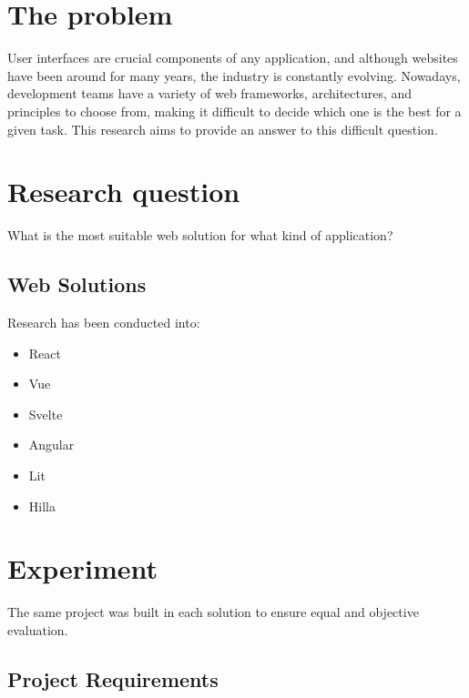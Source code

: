 \section{The problem}

User interfaces are crucial components of any application, and although websites have been around for many years, the industry is constantly evolving. Nowadays, development teams have a variety of web frameworks, architectures, and principles to choose from, making it difficult to decide which one is the best for a given task. This research aims to provide an answer to this difficult question.

\section{Research question}

What is the most suitable web solution for what kind of application?

\subsection{Web Solutions}
\label{subsec:intro:research:web_solutions}

Research has been conducted into:

\begin{itemize}
    \item React
    \item Vue
    \item Svelte
    \item Angular
    \item Lit
    \item Hilla
\end{itemize}

\section{Experiment}

The same project was built in each solution to ensure equal and objective evaluation. 

\subsection{Project Requirements}
\label{subsec:intro:experiment:project_requirements}

